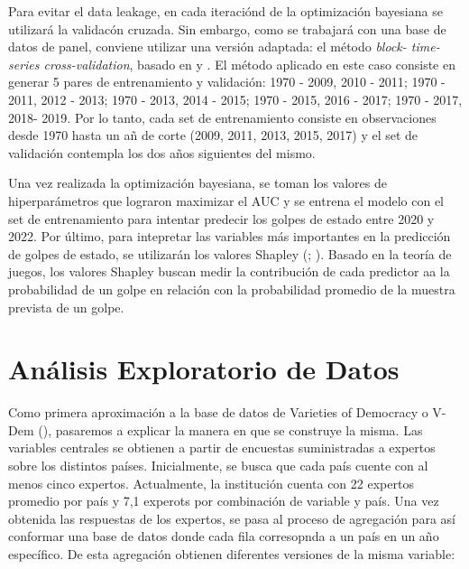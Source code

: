 \documentclass{article}
\begin{document}
Para evitar el data leakage, en cada iteraciónd de la optimización bayesiana
se utilizará la validacón cruzada. Sin embargo, como se trabajará con una base
de datos de panel, conviene utilizar una versión adaptada: el método \textit{block-
time-series cross-validation}, basado en \cite{Bur94} y \cite{RAc00}. El método 
aplicado en este caso consiste en generar 5 pares de entrenamiento y validación: 
{1970 - 2009, 2010 - 2011}; {1970 - 2011, 2012 - 2013}; {1970 - 2013, 2014 - 2015}; 
{1970 - 2015, 2016 - 2017}; {1970 - 2017, 2018- 2019}. Por lo tanto, cada set de 
entrenamiento consiste en observaciones desde 1970 hasta un añ de corte (2009, 
2011, 2013, 2015, 2017) y el set de validación contempla los dos años siguientes 
del mismo.

Una vez realizada la optimización bayesiana, se toman los valores de hiperparámetros
que lograron maximizar el AUC y se entrena el modelo con el set de entrenamiento 
para intentar predecir los golpes de estado entre 2020 y 2022. Por último, para 
intepretar las variables más importantes en la predicción de golpes de estado, se 
utilizarán los valores Shapley (\cite{Str10}; \cite{Lun17}). Basado en la teoría de 
juegos, los valores Shapley buscan medir la contribución de cada predictor aa la 
probabilidad de un golpe en relación con la probabilidad promedio de la muestra 
prevista de un golpe.

\section{Análisis Exploratorio de Datos}

Como primera aproximación a la base de datos de Varieties of Democracy o V-Dem 
(\cite{CopMet24}), pasaremos a explicar la manera en que se construye la misma. Las
variables centrales se obtienen a partir de encuestas suministradas a expertos
sobre los distintos países. Inicialmente, se busca que cada país cuente con al menos
cinco expertos. Actualmente, la institución cuenta con 22 expertos promedio por país
y 7,1 experots por combinación de variable y país. Una vez obtenida las respuestas
de los expertos, se pasa al proceso de agregación para así conformar una base de 
datos donde cada fila corresopnda a un país en un año específico. De esta agregación
obtienen diferentes versiones de la misma variable:
\end{document}
